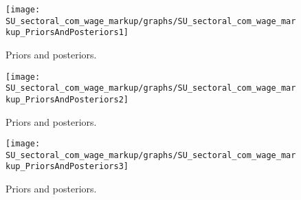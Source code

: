  
\begin{figure}[H]
\centering
\texttt{[image: SU\_sectoral\_com\_wage\_markup/graphs/SU\_sectoral\_com\_wage\_markup\_PriorsAndPosteriors1]}
\caption{Priors and posteriors.}\label{Fig:PriorsAndPosteriors:1}
\end{figure}
 
\begin{figure}[H]
\centering
\texttt{[image: SU\_sectoral\_com\_wage\_markup/graphs/SU\_sectoral\_com\_wage\_markup\_PriorsAndPosteriors2]}
\caption{Priors and posteriors.}\label{Fig:PriorsAndPosteriors:2}
\end{figure}
 
\begin{figure}[H]
\centering
\texttt{[image: SU\_sectoral\_com\_wage\_markup/graphs/SU\_sectoral\_com\_wage\_markup\_PriorsAndPosteriors3]}
\caption{Priors and posteriors.}\label{Fig:PriorsAndPosteriors:3}
\end{figure}
 
